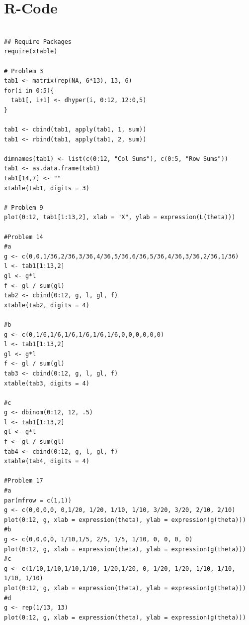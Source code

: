 \documentclass[12pt]{article}\usepackage[]{graphicx}\usepackage[]{color}
\begin{document}
\section*{R-Code}
\begin{verbatim}

## Require Packages
require(xtable)

# Problem 3
tab1 <- matrix(rep(NA, 6*13), 13, 6)
for(i in 0:5){
  tab1[, i+1] <- dhyper(i, 0:12, 12:0,5)
}

tab1 <- cbind(tab1, apply(tab1, 1, sum))
tab1 <- rbind(tab1, apply(tab1, 2, sum))

dimnames(tab1) <- list(c(0:12, "Col Sums"), c(0:5, "Row Sums"))
tab1 <- as.data.frame(tab1)
tab1[14,7] <- ""
xtable(tab1, digits = 3)

# Problem 9
plot(0:12, tab1[1:13,2], xlab = "X", ylab = expression(L(theta)))

#Problem 14
#a
g <- c(0,0,1/36,2/36,3/36,4/36,5/36,6/36,5/36,4/36,3/36,2/36,1/36)
l <- tab1[1:13,2]
gl <- g*l
f <- gl / sum(gl)
tab2 <- cbind(0:12, g, l, gl, f)
xtable(tab2, digits = 4)

#b
g <- c(0,1/6,1/6,1/6,1/6,1/6,1/6,0,0,0,0,0,0)
l <- tab1[1:13,2]
gl <- g*l
f <- gl / sum(gl)
tab3 <- cbind(0:12, g, l, gl, f)
xtable(tab3, digits = 4)

#c
g <- dbinom(0:12, 12, .5)
l <- tab1[1:13,2]
gl <- g*l
f <- gl / sum(gl)
tab4 <- cbind(0:12, g, l, gl, f)
xtable(tab4, digits = 4)

#Problem 17
#a
par(mfrow = c(1,1))
g <- c(0,0,0,0, 0,1/20, 1/20, 1/10, 1/10, 3/20, 3/20, 2/10, 2/10)
plot(0:12, g, xlab = expression(theta), ylab = expression(g(theta)))
#b
g <- c(0,0,0,0, 1/10,1/5, 2/5, 1/5, 1/10, 0, 0, 0, 0)
plot(0:12, g, xlab = expression(theta), ylab = expression(g(theta)))
#c
g <- c(1/10,1/10,1/10,1/10, 1/20,1/20, 0, 1/20, 1/20, 1/10, 1/10, 1/10, 1/10)
plot(0:12, g, xlab = expression(theta), ylab = expression(g(theta)))
#d
g <- rep(1/13, 13)
plot(0:12, g, xlab = expression(theta), ylab = expression(g(theta)))
\end{verbatim}
\end{document}
